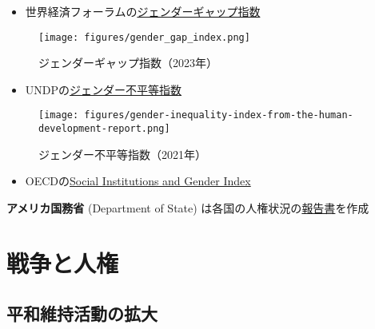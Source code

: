 \documentclass[
  xelatex,
  ja=standard]{bxjsarticle}
\providecommand{\tightlist}{%
  \setlength{\itemsep}{0pt}\setlength{\parskip}{0pt}}\usepackage{longtable,booktabs,array}
\begin{document}
\begin{itemize}
\tightlist
\item
  世界経済フォーラムの\href{https://jp.weforum.org/reports/global-gender-gap-report-2023}{ジェンダーギャップ指数}
\end{itemize}

\begin{figure}[htpb]

{\centering \texttt{[image: figures/gender\_gap\_index.png]}

}

\caption{ジェンダーギャップ指数（2023年）}

\end{figure}

\begin{itemize}
\tightlist
\item
  UNDPの\href{https://hdr.undp.org/data-center/thematic-composite-indices/gender-inequality-index\#/indicies/GII}{ジェンダー不平等指数}
\end{itemize}

\begin{figure}[htpb]

{\centering \texttt{[image: figures/gender-inequality-index-from-the-human-development-report.png]}

}

\caption{ジェンダー不平等指数（2021年）}

\end{figure}

\begin{itemize}
\tightlist
\item
  OECDの\href{https://www.genderindex.org/}{Social Institutions and
  Gender Index}
\end{itemize}

\textbf{アメリカ国務省} (Department of State)
は各国の人権状況の\href{https://jp.usembassy.gov/ja/category/reports-ja/}{報告書}を作成

\hypertarget{ux6226ux4e89ux3068ux4ebaux6a29}{%
\section{戦争と人権}\label{ux6226ux4e89ux3068ux4ebaux6a29}}

\hypertarget{ux5e73ux548cux7dadux6301ux6d3bux52d5ux306eux62e1ux5927}{%
\subsection{平和維持活動の拡大}\label{ux5e73ux548cux7dadux6301ux6d3bux52d5ux306eux62e1ux5927}}
\end{document}
